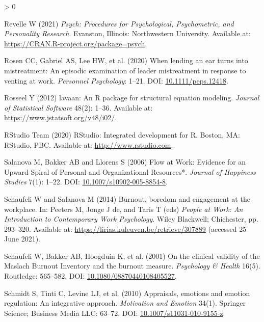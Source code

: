 \documentclass[
  english,
  man,floatsintext]{apa6}
\newlength{\cslhangindent}
\newenvironment{CSLReferences}[2] %
 {%
  \setlength{\parindent}{0pt}
  \ifodd #1 \everypar{\setlength{\hangindent}{\cslhangindent}}\ignorespaces\fi
  \ifnum #2 > 0
  \setlength{\parskip}{#2\baselineskip}
  \fi
 }%
 {}
\begin{document}
\begin{CSLReferences}{1}{0}
\leavevmode\hypertarget{ref-Revelle2021}{}%
Revelle W (2021) \emph{Psych: {P}rocedures for Psychological, Psychometric, and Personality Research}. Evanston, Illinois: Northwestern University. Available at: \url{https://CRAN.R-project.org/package=psych}.

\leavevmode\hypertarget{ref-Rosen2020}{}%
Rosen CC, Gabriel AS, Lee HW, et al. (2020) When lending an ear turns into mistreatment: {An} episodic examination of leader mistreatment in response to venting at work. \emph{Personnel Psychology}: 1--21. DOI: \href{https://doi.org/10.1111/peps.12418}{10.1111/peps.12418}.

\leavevmode\hypertarget{ref-Rosseel2012}{}%
Rosseel Y (2012) {lavaan}: {A}n {R} package for structural equation modeling. \emph{Journal of Statistical Software} 48(2): 1--36. Available at: \url{https://www.jstatsoft.org/v48/i02/}.

\leavevmode\hypertarget{ref-RStudioTeam2020}{}%
RStudio Team (2020) {RStudio}: {Integrated} development for {R}. Boston, MA: RStudio, PBC. Available at: \url{http://www.rstudio.com}.

\leavevmode\hypertarget{ref-Salanova2006}{}%
Salanova M, Bakker AB and Llorens S (2006) Flow at {Work}: {Evidence} for an {Upward} {Spiral} of {Personal} and {Organizational} {Resources}*. \emph{Journal of Happiness Studies} 7(1): 1--22. DOI: \href{https://doi.org/10.1007/s10902-005-8854-8}{10.1007/s10902-005-8854-8}.

\leavevmode\hypertarget{ref-Schaufeli2014}{}%
Schaufeli W and Salanova M (2014) Burnout, boredom and engagement at the workplace. In: Peeters M, Jonge J de, and Taris T (eds) \emph{People at Work: {An} {Introduction} to {Contemporary} {Work} {Psychology}}. Wiley Blackwell; Chichester, pp. 293--320. Available at: \url{https://lirias.kuleuven.be/retrieve/307889} (accessed 25 June 2021).

\leavevmode\hypertarget{ref-Schaufeli2001}{}%
Schaufeli W, Bakker AB, Hoogduin K, et al. (2001) On the clinical validity of the {Maslach} {Burnout} {Inventory} and the burnout measure. \emph{Psychology \& Health} 16(5). Routledge: 565--582. DOI: \href{https://doi.org/10.1080/08870440108405527}{10.1080/08870440108405527}.

\leavevmode\hypertarget{ref-Schmidt2010}{}%
Schmidt S, Tinti C, Levine LJ, et al. (2010) Appraisals, emotions and emotion regulation: An integrative approach. \emph{Motivation and Emotion} 34(1). Springer Science; Business Media {LLC}: 63--72. DOI: \href{https://doi.org/10.1007/s11031-010-9155-z}{10.1007/s11031-010-9155-z}.


\end{CSLReferences}
\end{document}
